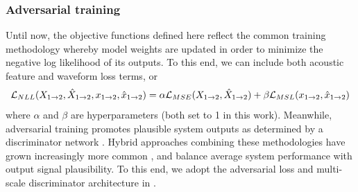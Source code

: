 \documentclass{article}
\begin{document}
\begin{sloppy}
\subsubsection{Adversarial training}
\label{sssec:gan}
Until now, the objective functions defined here reflect the common training methodology whereby model weights are updated in order to minimize the negative log likelihood of its outputs.  To this end, we can include both acoustic feature and waveform loss terms, or
\begin{equation}
\mathcal{L}_{NLL}(X_{1\rightarrow2}, \hat{X}_{1\rightarrow2}, x_{1\rightarrow2}, \hat{x}_{1\rightarrow2}) = \\ \alpha\mathcal{L}_{MSE}(X_{1\rightarrow2}, \hat{X}_{1\rightarrow2}) + \beta\mathcal{L}_{MSL}(x_{1\rightarrow2}, \hat{x}_{1\rightarrow2})
\end{equation} 
where $\alpha$ and $\beta$ are hyperparameters (both set to 1 in this work).  Meanwhile, adversarial training promotes plausible system outputs as determined by a discriminator network \cite{MelGAN}.  Hybrid approaches combining these methodologies have grown increasingly more common \cite{HooliGan, HifiGan, HifiGan2}, and balance average system performance with output signal plausibility. To this end, we adopt the adversarial loss and multi-scale discriminator architecture in \cite{MelGAN}.


\end{sloppy}
\end{document}
